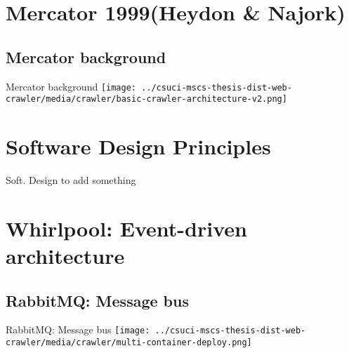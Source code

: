 \documentclass[9pt]{beamer}
\begin{document}
\section[Mercator]{Mercator 1999(Heydon \& Najork)}
\begin{frame}[plain]
\end{frame}


\subsection{Mercator background}
\begin{frame}{Mercator background}
  \centering
  \texttt{[image: ../csuci-mscs-thesis-dist-web-crawler/media/crawler/basic-crawler-architecture-v2.png]}
\end{frame}


\section[Soft. design]{Software Design Principles}
\begin{frame}[plain]
\end{frame}


\begin{frame}{Soft. Design}
  to add something
\end{frame}


\section[Event-driven]{Whirlpool: Event-driven architecture}
\begin{frame}[plain]
\end{frame}


\subsection{RabbitMQ: Message bus}
\begin{frame}{RabbitMQ: Message bus}
  \centering
  \texttt{[image: ../csuci-mscs-thesis-dist-web-crawler/media/crawler/multi-container-deploy.png]}
\end{frame}
\end{document}
